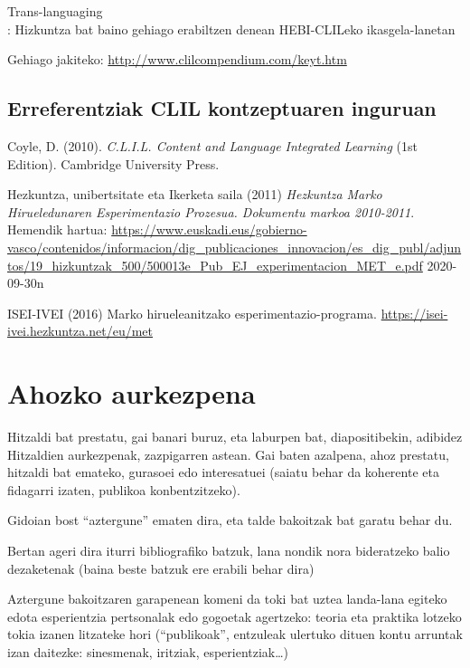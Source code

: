 \documentclass[
]{book}
\begin{document}
Trans-languaging\\
: Hizkuntza bat baino gehiago erabiltzen denean HEBI-CLILeko ikasgela-lanetan

Gehiago jakiteko: \url{http://www.clilcompendium.com/keyt.htm}

\hypertarget{erreferentziak-clil-kontzeptuaren-inguruan}{%
\section{Erreferentziak CLIL kontzeptuaren inguruan}\label{erreferentziak-clil-kontzeptuaren-inguruan}}

Coyle, D. (2010). \emph{C.L.I.L. Content and Language Integrated Learning} (1st Edition). Cambridge University Press.

Hezkuntza, unibertsitate eta Ikerketa saila (2011) \emph{Hezkuntza Marko Hirueledunaren Esperimentazio Prozesua. Dokumentu markoa 2010-2011}. Hemendik hartua: \url{https://www.euskadi.eus/gobierno-vasco/contenidos/informacion/dig_publicaciones_innovacion/es_dig_publ/adjuntos/19_hizkuntzak_500/500013e_Pub_EJ_experimentacion_MET_e.pdf} 2020-09-30n

ISEI-IVEI (2016) Marko hirueleanitzako esperimentazio-programa.
\url{https://isei-ivei.hezkuntza.net/eu/met}

\hypertarget{ahozko-aurkezpena}{%
\chapter*{Ahozko aurkezpena}\label{ahozko-aurkezpena}}

Hitzaldi bat prestatu, gai banari buruz, eta laburpen bat, diapositibekin, adibidez
Hitzaldien aurkezpenak, zazpigarren astean. Gai baten azalpena, ahoz prestatu, hitzaldi bat emateko, gurasoei edo interesatuei (saiatu behar da koherente eta fidagarri izaten, publikoa konbentzitzeko).

Gidoian bost ``aztergune'' ematen dira, eta talde bakoitzak bat garatu behar du.

Bertan ageri dira iturri bibliografiko batzuk, lana nondik nora bideratzeko balio dezaketenak (baina beste batzuk ere erabili behar dira)

Aztergune bakoitzaren garapenean komeni da toki bat uztea landa-lana egiteko edota esperientzia pertsonalak edo gogoetak agertzeko: teoria eta praktika lotzeko tokia izanen litzateke hori (``publikoak'', entzuleak ulertuko dituen kontu arruntak izan daitezke: sinesmenak, iritziak, esperientziak\ldots)
\end{document}
